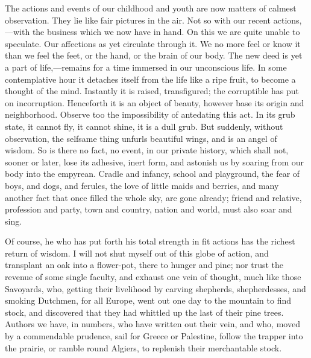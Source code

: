 The actions and events of our childhood and youth are now matters of
calmest observation. They lie like fair pictures in the air. Not so
with our recent ac\-tions,---with the business which we now have in
hand. On this we are quite unable to speculate. Our affections as yet
circulate through it. We no more feel or know it than we feel the
feet, or the hand, or the brain of our body. The new deed is yet a
part of life,---re\-mains for a time immersed in our unconscious life.
In some contemplative hour it detaches itself from the life like a
ripe fruit, to become a thought of the mind. Instantly it is raised,
transfigured; the corruptible has put on incorruption. Henceforth it
is an object of beauty, however base its origin and neighborhood.
Observe too the impossibility of antedating this act. In its grub
state, it cannot fly, it cannot shine, it is a dull grub. But
suddenly, without observation, the selfsame thing unfurls beautiful
wings, and is an angel of wisdom. So is there no fact, no event, in
our private history, which shall not, sooner or later, lose its
 adhesive, inert form, and astonish us by soaring from our
body into the empyrean. Cradle and infancy, school and playground, the
fear of boys, and dogs, and ferules, the love of little maids and
berries, and many another fact that once filled the whole sky, are
gone already; friend and relative, profession and party, town and
country, nation and world, must also soar and sing.


Of course, he who has put forth his total strength in fit actions has
the richest return of wisdom. I will not shut myself out of this globe
of action, and transplant an oak into a flower-pot, there to hunger
and pine; nor trust the revenue of some single faculty, and exhaust
one vein of thought, much like those Savoyards, who, getting their
livelihood by carving shepherds, shepherdesses, and smoking Dutchmen,
for all Europe, went out one day to the mountain to find stock, and
discovered that they had whittled up the last of their pine trees.
Authors we have, in numbers, who have written out their vein, and who,
moved by a commendable prudence, sail for Greece or Palestine, follow
the trapper into the prairie, or ramble round Algiers, to replenish
their merchantable stock.

